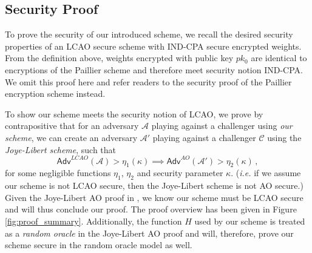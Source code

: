 \documentclass[10pt,letterpaper,oneside,twocolumn,journal]{IEEEtran}
\theoremstyle{definition}
\theoremstyle{definition}
\theoremstyle{remark}
\begin{document}
% 
% 

\subsection{Security Proof}
To prove the security of our introduced scheme, we recall the desired security properties of an LCAO secure scheme with IND-CPA secure encrypted weights. From the definition above, weights encrypted with public key $pk_0$ are identical to encryptions of the Paillier scheme and therefore meet security notion IND-CPA. We omit this proof here and refer readers to the security proof of the Paillier encryption scheme \cite{paillierPublicKeyCryptosystemsBased1999} instead.

To show our scheme meets the security notion of LCAO, we prove by contrapositive that for an adversary $\mathcal{A}$ playing against a challenger using \textit{our scheme}, we can create an adversary $\mathcal{A}'$ playing against a challenger $\mathcal{C}$ using the \textit{Joye-Libert scheme}, such that
\begin{equation*}
    \mathsf{Adv}^{LCAO}(\mathcal{A}) > \eta_1(\kappa) \implies \mathsf{Adv}^{AO}(\mathcal{A}') > \eta_2(\kappa)\,,
\end{equation*}
for some negligible functions $\eta_1$, $\eta_2$ and security parameter $\kappa$. (\textit{i.e.} if we assume our scheme is not LCAO secure, then the Joye-Libert scheme is not AO secure.) Given the Joye-Libert AO proof in \cite{joyeScalableSchemePrivacyPreserving2013}, we know our scheme must be LCAO secure and will thus conclude our proof. The proof overview has been given in Figure \ref{fig:proof_summary}. Additionally, the function $H$ used by our scheme is treated as a \textit{random oracle} in the Joye-Libert AO proof and will, therefore, prove our scheme secure in the random oracle model as well.
\end{document}
